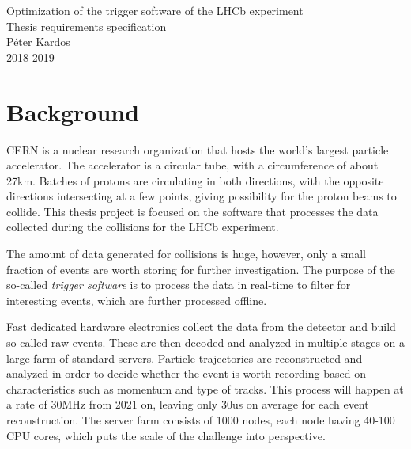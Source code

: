\documentclass[12pt]{article}
\begin{document}
	
	
	\begin{center}
		\Huge Optimization of the trigger software of the LHCb experiment\\		
		\Large Thesis requirements specification\\
		\vspace{1pc}
		\huge Péter Kardos \\
		\large 2018-2019
	\end{center}
	
	
	\section{Background}
	
	
	CERN\cite{cern_about} is a nuclear research organization that hosts the world's largest particle accelerator\cite{lhc_desc}. The accelerator is a circular tube, with a circumference of about 27km. Batches of protons are circulating in both directions, with the opposite directions intersecting at a few points, giving possibility for the proton beams to collide. This thesis project is focused on the software that processes the data collected during the collisions for the LHCb\cite{lchb_desc} experiment.
	
	\vspace{0.7pc}
	The amount of data generated for collisions is huge, however, only a small fraction of events are worth storing for further investigation. The purpose of the so-called \textit{trigger software} is to process the data in real-time to filter for interesting events, which are further processed offline.
	
	\vspace{0.7pc}
	\color{blue}
	Fast dedicated hardware electronics collect the data from the detector and build so called raw events. These are then decoded and analyzed in multiple stages on a large farm of standard servers. Particle trajectories are reconstructed and analyzed in order to decide whether the event is worth recording based on characteristics such as momentum and type of tracks. This process will happen at a rate of 30MHz from 2021 on, leaving only 30us on average for each event reconstruction. The server farm consists of 1000 nodes, each node having 40-100 CPU cores, which puts the scale of the challenge into perspective.
	\color{black}
		
\end{document}
